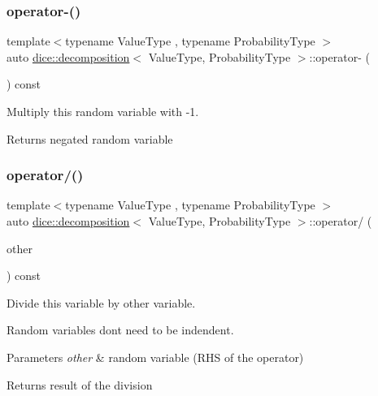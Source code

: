 \subsubsection{\texorpdfstring{operator-\/()}{operator-()}\hspace{0.1cm}{\footnotesize\ttfamily [2/2]}}
{\footnotesize\ttfamily template$<$typename Value\+Type , typename Probability\+Type $>$ \\
auto \mbox{\hyperlink{classdice_1_1decomposition}{dice\+::decomposition}}$<$ Value\+Type, Probability\+Type $>$\+::operator-\/ (\begin{DoxyParamCaption}{ }\end{DoxyParamCaption}) const\hspace{0.3cm}{\ttfamily [inline]}}



Multiply this random variable with -\/1. 

\begin{DoxyReturn}{Returns}
negated random variable 
\end{DoxyReturn}
\mbox{\label{classdice_1_1decomposition_ad7e95a376d87a8440ff4ebb4445b264a}} 
\subsubsection{\texorpdfstring{operator/()}{operator/()}}
{\footnotesize\ttfamily template$<$typename Value\+Type , typename Probability\+Type $>$ \\
auto \mbox{\hyperlink{classdice_1_1decomposition}{dice\+::decomposition}}$<$ Value\+Type, Probability\+Type $>$\+::operator/ (\begin{DoxyParamCaption}\item[{const \mbox{\hyperlink{classdice_1_1decomposition}{decomposition}}$<$ Value\+Type, Probability\+Type $>$ \&}]{other }\end{DoxyParamCaption}) const\hspace{0.3cm}{\ttfamily [inline]}}



Divide this variable by other variable. 

Random variables don\textquotesingle{}t need to be indendent.


\begin{DoxyParams}{Parameters}
{\em other} & random variable (R\+HS of the operator)\\
\hline
\end{DoxyParams}
\begin{DoxyReturn}{Returns}
result of the division 
\end{DoxyReturn}
\mbox{\label{classdice_1_1decomposition_ae3431215ee061fd0db5d578e270b0888}} 
